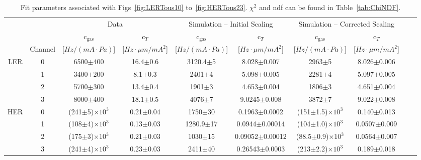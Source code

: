 \begin{table}
    \centering
    \begin{tabular}{cc|cc|cc|cccc}
	&		&	 \multicolumn{2}{c}{Data}			&	 \multicolumn{2}{c}{Simulation – Initial Scaling} 			&	 \multicolumn{2}{c}{Simulation – Corrected Scaling}  	 		\\	
	&	 	&	 c$_{\mathrm{gas}}$	&	 c$_{T}$	&	 c$_{\mathrm{gas}}$	&	 c$_{T}$ 	&	 c$_{\mathrm{gas}}$	&	 c$_{T}$ 	\\	
	&	Channel 	&	  [$Hz/(mA\cdot Pa)$]	&	 [$Hz\cdot\mu m/mA^{2}$]	&	 [$Hz/(mA\cdot Pa)$]	&	 [$Hz\cdot\mu m/mA^{2}$]  	&	  [$Hz/(mA\cdot Pa)$]	&	 [$Hz\cdot\mu m/mA^{2}$]  	\\	\hline \hline
LER	&	 0	&	 6500$\pm$400	&	 16.4$\pm$0.6	&	 3120.4$\pm$5	&	 8.028$\pm$0.007	&	 2963$\pm$5	&	 8.026$\pm$0.006	\\	
	&	 1	&	 3400$\pm$200	&	 8.1$\pm$0.3	&	 2401$\pm$4	&	 5.098$\pm$0.005	&	 2281$\pm$4	&	 5.097$\pm$0.005	\\	
	&	 2	&	 5700$\pm$300	&	 13.4$\pm$0.4	&	 1901$\pm$3	&	 4.653$\pm$0.004	&	 1806$\pm$3	&	 4.651$\pm$0.004	\\	
	&	 3	&	 8000$\pm$400	&	 18.1$\pm$0.5	&	 4076$\pm$7	&	 9.0245$\pm$0.008	&	 3872$\pm$7	&	 9.022$\pm$0.008	\\	\hline
HER	&	0	&	 (241$\pm$5)$\times10^{3}$	&	 0.21$\pm$0.04	&	 1750$\pm$30	&	 0.1963$\pm$0.0002 	&	 (151$\pm$1.5)$\times10^{3}$	&	 0.140$\pm$0.013	\\	
	&	1	&	 (108$\pm$4)$\times10^{3}$	&	 0.13$\pm$0.03	&	 1280.9$\pm$17	&	 0.0944$\pm$0.00014	&	 (104$\pm$1.0)$\times10^{3}$	&	 0.0507$\pm$0.009	\\	
	&	2	&	 (175$\pm$3)$\times10^{3}$	&	 0.21$\pm$0.03	&	 1030$\pm$15	&	 0.09052$\pm$0.00012	&	 (88.5$\pm$0.9)$\times10^{3}$ 	&	 0.0564$\pm$0.007	\\	
	&	3	&	 (241$\pm$4)$\times10^{3}$	&	 0.23$\pm$0.03	&	 2411$\pm$40	&	 0.26543$\pm$0.0003 	&	 (213$\pm$2.2)$\times10^{3}$	&	 0.189$\pm$0.018 	\\	\hline

    \end{tabular}
    \caption[Fit parameters associated with Figs~\ref{fig:LERTous10} to~\ref{fig:HERTous23}]{Fit parameters associated with Figs~\ref{fig:LERTous10} to~\ref{fig:HERTous23}. $\chi^2$ and ndf can be found in Table~\ref{tab:ChiNDF}.}
    \label{tab:FitPars}
\end{table}


